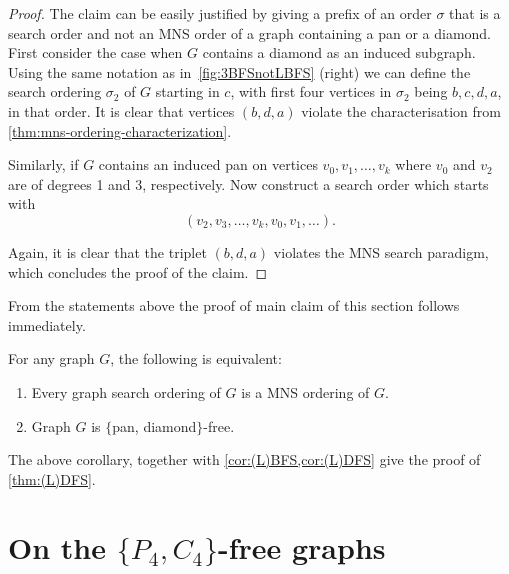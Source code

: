 \documentclass{svproc}
\begin{document}
\begin{proof}
The claim can be easily justified by giving a prefix of an order $\sigma$ that is a search order and not an MNS order of a graph containing a pan or a diamond.
First consider the case when $G$ contains a diamond as an induced subgraph. Using the same notation as in~\cref{fig:3BFSnotLBFS} (right) we can define the search ordering $\sigma_2$ of $G$ starting in $c$, with first four vertices in $\sigma_2$ being $b,c,d,a$, in that order. It is clear that vertices $(b,d,a)$ violate the characterisation from \cref{thm:mns-ordering-characterization}.

Similarly, if $G$ contains an induced pan on vertices $v_0,v_1,\dots,v_k$ where $v_0$ and $v_2$ are of degrees 1 and 3, respectively. Now construct a search order which starts with 
$$
(v_2,v_3,\dots,v_k,v_0,v_1,\dots).
$$

Again, it is clear that the triplet $(b,d,a)$ violates the MNS search paradigm, which concludes the proof of the claim.
\end{proof}

From the statements above the proof of main claim of this section follows immediately. 

\begin{corollary}\label{cor:g-MNS}
For any graph $G$, the following is equivalent: 
\begin{enumerate}[nosep, label = \roman*)]
    \item Every graph search ordering of $G$ is a MNS ordering of $G$.
    \item Graph $G$ is $\{$pan, diamond$\}$-free.
\end{enumerate}
\end{corollary}

The above corollary, together with \cref{cor:(L)BFS,cor:(L)DFS} give the proof of \cref{thm:(L)DFS}.

\section{On the $\{P_4,C_4\}$-free graphs}\label{sec:P4-C4}
\end{document}
